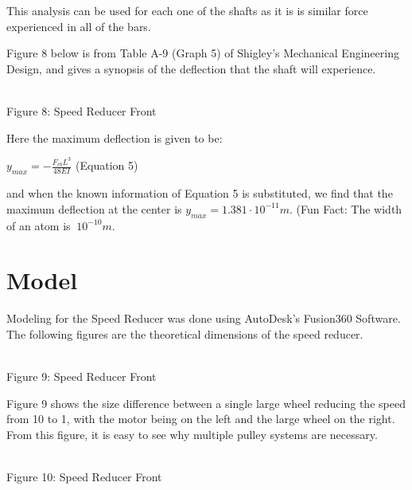 \documentclass{article}
\begin{document}
This analysis can be used for each one of the shafts as it is is similar force experienced in all of the bars.

Figure 8 below is from Table A-9 (Graph 5) of Shigley's Mechanical Engineering Design, and gives a synopsis of the deflection that the shaft will experience.

\begin{center}
\\
\scriptsize{
Figure 8: Speed Reducer Front
}
\end{center}

Here the maximum deflection is given to be:
\begin{center}
$y_{max} = -\frac{F_{rb}L^3}{48EI}$ (Equation 5)
\end{center}
and when the known information of Equation 5 is substituted, we find that the maximum deflection at the center is $y_{max} = 1.381 \cdot 10^{-11}m$. (Fun Fact: The width of an atom is $~10^{-10}m$.

\section{Model}
Modeling for the Speed Reducer was done using AutoDesk's Fusion360 Software. The following figures are the theoretical dimensions of the speed reducer. 

\begin{center}
\\
\scriptsize{
Figure 9: Speed Reducer Front
}
\end{center}

Figure 9 shows the size difference between a single large wheel reducing the speed from 10 to 1, with the motor being on the left and the large wheel on the right. From this figure, it is easy to see why multiple pulley systems are necessary. 

\begin{center}
\\
\scriptsize{
Figure 10: Speed Reducer Front
}
\end{center}
\end{document}
